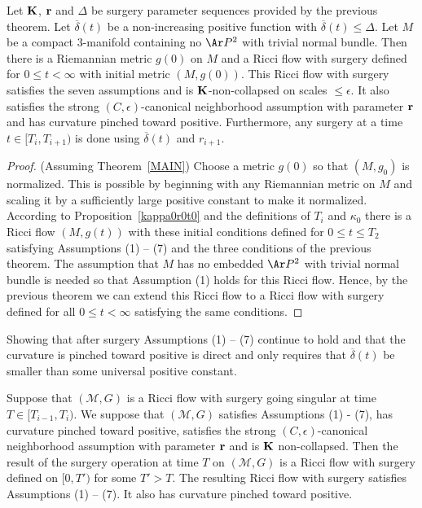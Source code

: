 \begin{corollary}
\label{cor:ricci-flow-surgery-exists-all-time}\label{RFSexists}
Let ${\bf K}$, ${\bf r}$ and $\Delta$ be surgery parameter sequences
provided by the previous theorem. Let $\overline\delta(t)$ be a
non-increasing positive function with $\overline\delta(t)\le
\Delta$. Let $M$ be a compact $3$-manifold containing no $\Ar P^2$
with trivial normal bundle. Then there is a Riemannian metric $g(0)$
on $M$ and a Ricci flow with surgery defined for $0\le t<\infty$
with  initial metric $(M,g(0))$. This Ricci flow with surgery
satisfies the seven assumptions and is ${\bf K}$-non-collapsed on
scales $\le \epsilon$. It also satisfies the strong
$(C,\epsilon)$-canonical neighborhood assumption with parameter
${\bf r}$ and has curvature pinched toward positive. Furthermore,
any surgery at a time $t\in [T_i,T_{i+1})$ is done using
$\overline\delta(t)$ and $r_{i+1}$.
\end{corollary}

\begin{proof}
 (Assuming Theorem~\ref{MAIN})
Choose a metric $g(0)$ so that $(M,g_0)$ is normalized. This is
possible by beginning with any Riemannian metric on $M$ and scaling
it by a sufficiently large positive constant to make it normalized.
According to Proposition~\ref{kappa0r0t0} and the definitions of
$T_i$ and $\kappa_0$ there is a Ricci flow $(M,g(t))$ with these
initial conditions defined for $0\le t\le T_2$ satisfying Assumptions (1) -- (7)
and the three conditions of the previous theorem. The assumption that
$M$ has no embedded $\Ar P^2$ with trivial normal bundle is needed so that Assumption (1) holds
for this Ricci flow.
 Hence, by the previous theorem we can extend this
Ricci flow to a Ricci flow with surgery defined for all $0\le
t<\infty$ satisfying the same conditions.
\end{proof}





Showing that after surgery Assumptions (1) -- (7) continue to hold and
that the curvature is pinched toward positive is direct and only requires that
$\overline\delta(t)$ be smaller than some universal positive constant.

\begin{lemma}
\label{lem:surgery-preserves-assumptions-pinching}\label{14.26}
Suppose that $({\mathcal M},G)$ is a Ricci flow with surgery going
singular at time $T\in [T_{i-1},T_i)$. We suppose that $({\mathcal
M},G)$ satisfies Assumptions (1) - (7),  has curvature pinched toward
positive, satisfies the strong $(C,\epsilon)$-canonical neighborhood
assumption with parameter ${\bf r}$ and is ${\bf K}$ non-collapsed.
Then the result of the surgery operation  at time $T$ on $({\mathcal M},G)$ is a
 Ricci flow with surgery defined on $[0,T')$ for some $T'>T$.
 The resulting Ricci flow with
surgery satisfies Assumptions (1) -- (7). It also has curvature pinched
toward positive.
\end{lemma}

